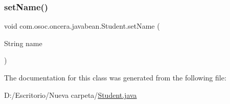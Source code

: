 \mbox{\label{classcom_1_1osoc_1_1oncera_1_1javabean_1_1_student_a5d845e9851c05afb091bce95c5061f2e}} 
\subsubsection{\texorpdfstring{setName()}{setName()}}
{\footnotesize\ttfamily void com.\+osoc.\+oncera.\+javabean.\+Student.\+set\+Name (\begin{DoxyParamCaption}\item[{String}]{name }\end{DoxyParamCaption})}



The documentation for this class was generated from the following file\+:\begin{DoxyCompactItemize}
\item 
D\+:/\+Escritorio/\+Nueva carpeta/\mbox{\hyperlink{_student_8java}{Student.\+java}}\end{DoxyCompactItemize}
